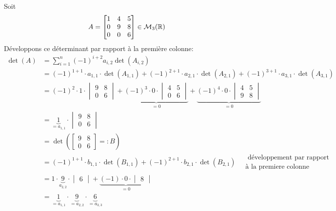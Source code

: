 \begin{eg}
   Soit  
   \[
   A = 
   \begin{bmatrix} 
       1 & 4 & 5\\
       0 & 9 & 8\\
       0 & 0 & 6
   \end{bmatrix} \in \mathcal{M}_3(\mathbb{R})
   \] 
Développons ce déterminant par rapport à la première colonne:
\begin{align*}
    \det(A) &= \sum_{i=1}^{n} (-1)^{i + 2} a_{i, 2} \det(A_{i, 2}) \\
            &= (-1)^{1 + 1} \cdot a_{1, 1} \cdot \det(A_{1, 1}) + (-1)^{2 + 1} \cdot a_{2, 1} \cdot \det(A_{2,1})  + (-1)^{3 + 1} \cdot a_{3, 1} \cdot \det(A_{3, 1}) \\
            &= (-1)^{2} \cdot 1 \cdot \begin{vmatrix} 9 & 8 \\ 0 & 6 \end{vmatrix} + \underbrace{(-1)^{3} \cdot 0 \cdot \begin{vmatrix} 4 & 5 \\ 0 & 6 \end{vmatrix}}_{= 0}  + \underbrace{(-1)^{4} \cdot 0 \cdot \begin{vmatrix} 4 & 5 \\ 9 & 8 \end{vmatrix}}_{= 0} \\
            &= \underbrace{1}_{= a_{1,1}} \cdot \begin{vmatrix} 9 & 8 \\ 0 & 6 \end{vmatrix}\\
            &= \det(\begin{bmatrix} 9 & 8 \\ 0 & 6 \end{bmatrix} =: B)\\
            &= (-1)^{1 + 1} \cdot b_{1, 1} \cdot \det(B_{1,1}) + (-1)^{2 + 1} \cdot b_{2, 1} \cdot \det(B_{2, 1}) \quad \substack{\text{ développement par rapport}\\\text{à la premiere colonne}}\\
            &= 1 \cdot \underbrace{9}_{a_{2,2}} \cdot \begin{vmatrix} 6 \end{vmatrix} + \underbrace{(-1) \cdot 0 \cdot \begin{vmatrix} 8 \end{vmatrix} }_{= 0}\\
            &= \underbrace{1}_{= a_{1,1}} \cdot \underbrace{9}_{= a_{2,2}} \cdot \underbrace{6}_{= a_{3,3}}
\end{align*}
\end{eg}

